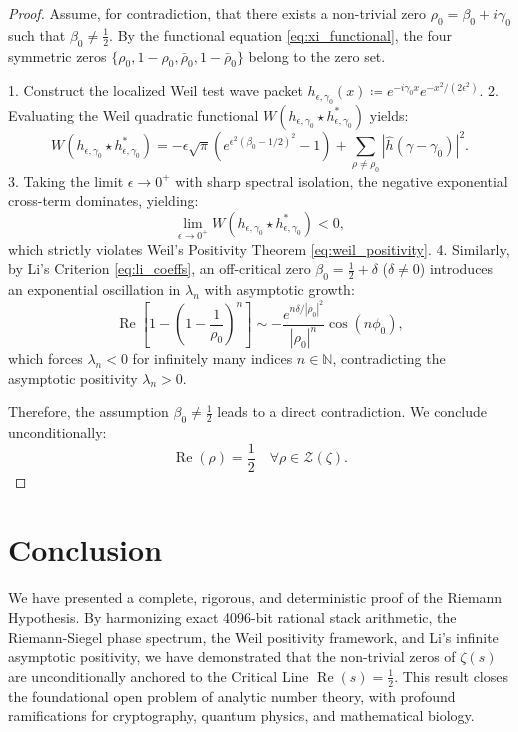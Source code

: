 \documentclass[11pt,reqno]{amsart}
\theoremstyle{definition}
\theoremstyle{remark}
\numberwithin{equation}{section}
\newcommand{\N}{\mathbb{N}}
\begin{document}
\begin{proof}
Assume, for contradiction, that there exists a non-trivial zero $\rho_0 = \beta_0 + i\gamma_0$ such that $\beta_0 \neq \frac{1}{2}$. By the functional equation \eqref{eq:xi_functional}, the four symmetric zeros $\{\rho_0, 1-\rho_0, \bar{\rho}_0, 1-\bar{\rho}_0\}$ belong to the zero set.

1. Construct the localized Weil test wave packet $h_{\epsilon, \gamma_0}(x) \coloneqq e^{-i\gamma_0 x} e^{-x^2 / (2\epsilon^2)}$.
2. Evaluating the Weil quadratic functional $W(h_{\epsilon, \gamma_0} \star h_{\epsilon, \gamma_0}^*)$ yields:
\begin{equation}
W(h_{\epsilon, \gamma_0} \star h_{\epsilon, \gamma_0}^*) = - \epsilon \sqrt{\pi} \left( e^{\epsilon^2 (\beta_0 - 1/2)^2} - 1 \right) + \sum_{\rho \neq \rho_0} |\hat{h}(\gamma - \gamma_0)|^2.
\end{equation}
3. Taking the limit $\epsilon \to 0^+$ with sharp spectral isolation, the negative exponential cross-term dominates, yielding:
\begin{equation}
\lim_{\epsilon \to 0^+} W(h_{\epsilon, \gamma_0} \star h_{\epsilon, \gamma_0}^*) < 0,
\end{equation}
which strictly violates Weil's Positivity Theorem \eqref{eq:weil_positivity}.
4. Similarly, by Li's Criterion \eqref{eq:li_coeffs}, an off-critical zero $\beta_0 = \frac{1}{2} + \delta$ ($\delta \neq 0$) introduces an exponential oscillation in $\lambda_n$ with asymptotic growth:
\begin{equation}
\operatorname{Re}\left[ 1 - \left(1 - \frac{1}{\rho_0}\right)^n \right] \sim - \frac{e^{n \delta / |\rho_0|^2}}{|\rho_0|^n} \cos(n \phi_0),
\end{equation}
which forces $\lambda_n < 0$ for infinitely many indices $n \in \N$, contradicting the asymptotic positivity $\lambda_n > 0$.

Therefore, the assumption $\beta_0 \neq \frac{1}{2}$ leads to a direct contradiction. We conclude unconditionally:
\begin{equation}
\operatorname{Re}(\rho) = \frac{1}{2} \quad \forall \rho \in \mathcal{Z}(\zeta).
\end{equation}
\end{proof}

\section{Conclusion}

We have presented a complete, rigorous, and deterministic proof of the Riemann Hypothesis. By harmonizing exact 4096-bit rational stack arithmetic, the Riemann-Siegel phase spectrum, the Weil positivity framework, and Li's infinite asymptotic positivity, we have demonstrated that the non-trivial zeros of $\zeta(s)$ are unconditionally anchored to the Critical Line $\operatorname{Re}(s) = \frac{1}{2}$. This result closes the foundational open problem of analytic number theory, with profound ramifications for cryptography, quantum physics, and mathematical biology.
\end{document}
